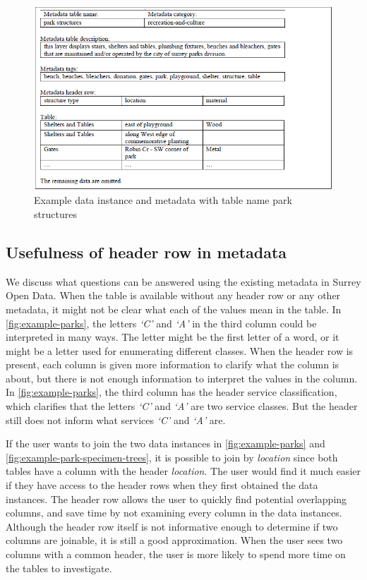 \begin{figure}
    \centering
    \includegraphics[width=5in]{figures/example-park-structures.png}
    \caption{Example data instance and metadata with table name park structures}
    \label{fig:example-park-structures}
\end{figure}

\subsection{Usefulness of header row in metadata}

We discuss what questions can be answered using the existing metadata in Surrey Open Data. When the table is available without any header row or any other metadata, it might not be clear what each of the values mean in the table. In \autoref{fig:example-parks}, the letters \textit{`C'} and \textit{`A'} in the third column could be interpreted in many ways. The letter might be the first letter of a word, or it might be a letter used for enumerating different classes. When the header row is present, each column is given more information to clarify what the column is about, but there is not enough information to interpret the values in the column. In \autoref{fig:example-parks}, the third column has the header service classification, which clarifies that the letters \textit{`C'} and \textit{`A'} are two service classes. But the header still does not inform what services \textit{`C'} and \textit{`A'} are.

If the user wants to join the two data instances in \autoref{fig:example-parks} and \autoref{fig:example-park-specimen-trees}, it is possible to join by \textit{location} since both tables have a column with the header \textit{location}. The user would find it much easier if they have access to the header rows when they first obtained the data instances. The header row allows the user to quickly find potential overlapping columns, and save time by not examining every column in the data instances. Although the header row itself is not informative enough to determine if two columns are joinable, it is still a good approximation. When the user sees two columns with a common header, the user is more likely to spend more time on the tables to investigate.

